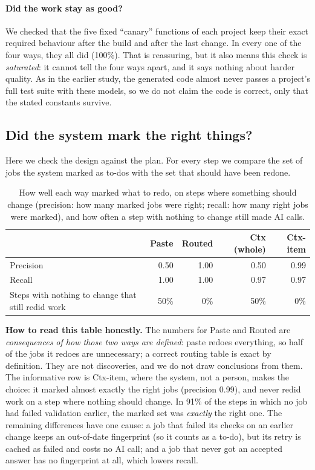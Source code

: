 \documentclass[10pt,a4paper]{article}
\begin{document}
\paragraph{Did the work stay as good?} We checked that the five fixed ``canary'' functions of each project keep
their exact required behaviour after the build and after the last change. In every one of the four ways, they all
did (100\%). That is reassuring, but it also means this check is \emph{saturated}: it cannot tell the four ways
apart, and it says nothing about harder quality. As in the earlier study, the generated code almost never passes
a project's full test suite with these models, so we do not claim the code is correct, only that the stated
constants survive.

\subsection{Did the system mark the right things?}\label{sec:exact}

Here we check the design against the plan. For every step we compare the set of jobs the system marked as
to-dos with the set that should have been redone.

\begin{table}[h]
\centering\small
\caption{How well each way marked what to redo, on steps where something should change (precision: how many marked
jobs were right; recall: how many right jobs were marked), and how often a step with nothing to change still made
AI calls.}
\label{tab:impact}
\begin{tabular}{@{}l r r r r@{}}
\toprule
 & Paste & Routed & Ctx (whole) & Ctx-item \\
\midrule
Precision & 0.50 & 1.00 & 0.50 & 0.99 \\
Recall & 1.00 & 1.00 & 0.97 & 0.97 \\
Steps with nothing to change that still redid work & 50\% & 0\% & 50\% & 0\% \\
\bottomrule
\end{tabular}
\end{table}

\textbf{How to read this table honestly.} The numbers for Paste and Routed are \emph{consequences of how those two
ways are defined}: paste redoes everything, so half of the jobs it redoes are unnecessary; a correct routing table
is exact by definition. They are not discoveries, and we do not draw conclusions from them. The informative row
is Ctx-item, where the system, not a person, makes the choice: it marked almost exactly the right jobs
(precision 0.99), and never redid work on a step where nothing should change. In 91\% of the steps in which no job
had failed validation earlier, the marked set was \emph{exactly} the right one. The remaining differences have one
cause: a job that failed its checks on an earlier change keeps an out-of-date fingerprint (so it counts as a
to-do), but its retry is cached as failed and costs no AI call; and a job that never got an accepted answer has
no fingerprint at all, which lowers recall.
\end{document}
